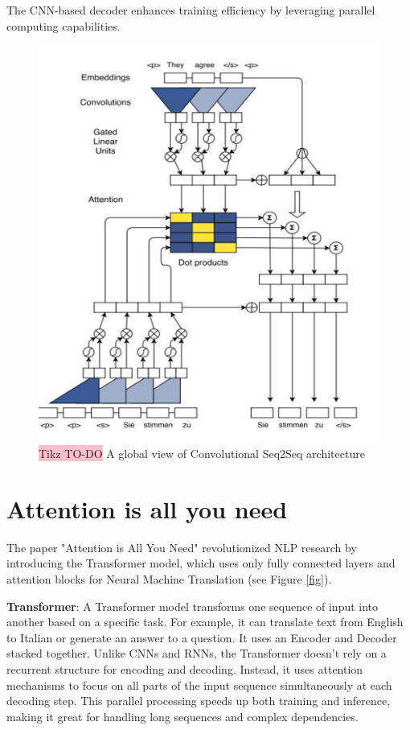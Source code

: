 The CNN-based decoder enhances training efficiency by leveraging parallel computing capabilities.

\begin{figure}[!htbp]
    \centering
    \includegraphics[width=\linewidth]{tikz/Convolutional Seq2Seq.png}
    \caption{{\color{red}\colorbox{pink}{Tikz TO-DO}} A global view of Convolutional Seq2Seq architecture}
    \label{fig:C-Seq2Seq}
\end{figure}


\section{Attention is all you need}

The paper "Attention is All You Need" revolutionized NLP research by introducing the Transformer model, which uses only fully connected layers and attention blocks for Neural Machine Translation (see Figure \ref{fig}).

\textbf{Transformer}: A Transformer model transforms one sequence of input into another based on a specific task. For example, it can translate text from English to Italian or generate an answer to a question. It uses an Encoder and Decoder stacked together. Unlike CNNs and RNNs, the Transformer doesn't rely on a recurrent structure for encoding and decoding. Instead, it uses attention mechanisms to focus on all parts of the input sequence simultaneously at each decoding step. This parallel processing speeds up both training and inference, making it great for handling long sequences and complex dependencies.


